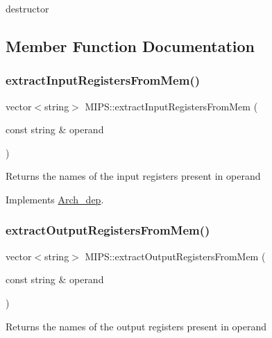destructor 

\subsection{Member Function Documentation}
\mbox{\label{classMIPS_acf8659c9a36074bbe47455275a4829f7}} 
\subsubsection{\texorpdfstring{extract\+Input\+Registers\+From\+Mem()}{extractInputRegistersFromMem()}}
{\footnotesize\ttfamily vector$<$string$>$ M\+I\+P\+S\+::extract\+Input\+Registers\+From\+Mem (\begin{DoxyParamCaption}\item[{const string \&}]{operand }\end{DoxyParamCaption})\hspace{0.3cm}{\ttfamily [virtual]}}

Returns the names of the input registers present in operand 

Implements \hyperlink{classArch__dep_a02bb8952fdf52e2a11ca009509b7bf46}{Arch\+\_\+dep}.

\mbox{\label{classMIPS_af03518e68285f24da7a0b2e16020d8d2}} 
\subsubsection{\texorpdfstring{extract\+Output\+Registers\+From\+Mem()}{extractOutputRegistersFromMem()}}
{\footnotesize\ttfamily vector$<$string$>$ M\+I\+P\+S\+::extract\+Output\+Registers\+From\+Mem (\begin{DoxyParamCaption}\item[{const string \&}]{operand }\end{DoxyParamCaption})\hspace{0.3cm}{\ttfamily [virtual]}}

Returns the names of the output registers present in operand 

